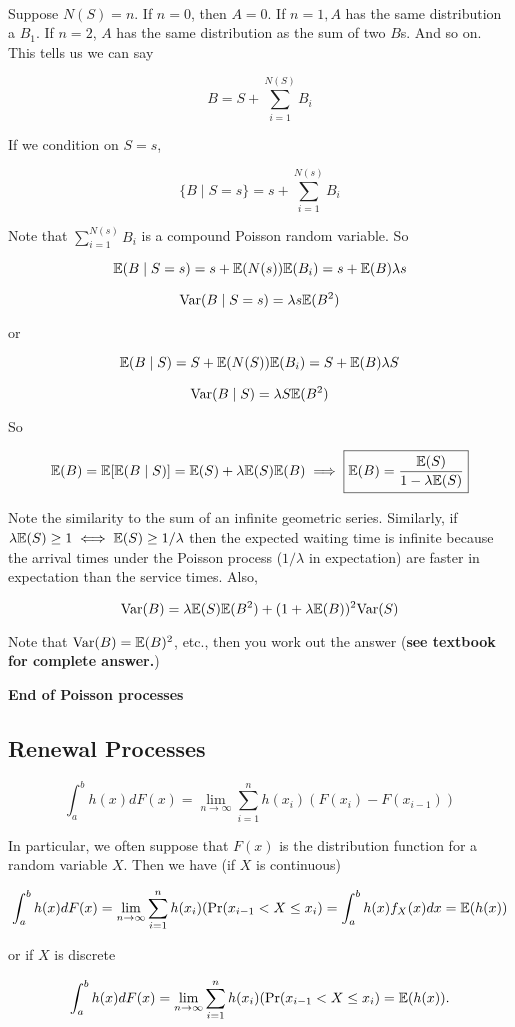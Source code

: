 \

Suppose \(N(S) = n\). If \(n=0\), then \(A = 0\). If \(n=1, A\) has the same distribution a \(B_1\). If \(n=2\), \(A\) has the same distribution as the sum of two \(B\)s. And so on. This tells us we can say

\[
B = S + \sum_{i=1}^{N(S)} B_i
\]

If we condition on \(S=s\),

\[
\{B \mid S =s\} = s + \sum_{i=1}^{N(s)} B_i
\]

Note that \( \sum_{i=1}^{N(s)} B_i\) is a compound Poisson random variable. So

\[
\E(B \mid S =s) = s +\E(N(s)) \E( B_i) = s + \E(B) \lambda s
\]

\[
\Var(B \mid S=s) = \lambda s \E(B^2)
\]

or

\[
\E(B \mid S) = S +\E(N(S)) \E( B_i) = S + \E(B) \lambda S
\]

\[
\Var(B \mid S) = \lambda S \E(B^2)
\]

So

\[
\E(B) = \E[\E(B \mid S)] = \E(S) + \lambda \E(S) \E(B) \implies \boxed{\E(B) = \frac{\E(S)}{1 - \lambda \E(S)}}
\]

Note the similarity to the sum of an infinite geometric series. Similarly, if \(\lambda \E(S) \geq 1 \iff \E(S) \geq 1/\lambda\) then the expected waiting time is infinite because the arrival times under the Poisson process (\(1/\lambda\) in expectation) are faster in expectation than the service times. Also,

\[
\Var(B) = \lambda \E(S) \E(B^2) + (1 + \lambda \E(B))^2 \Var(S)
\]

Note that \(\Var(B) = \E(B)^2\), etc., then you work out the answer (\textbf{see textbook for complete answer.})

\textbf{End of Poisson processes}

\subsection{Renewal Processes}

\begin{definition}

\[
\int_a^b h(x) dF(x) = \lim_{n \to \infty} \sum_{i=1}^n h(x_i)( F(x_i ) - F(x_{i-1}))
\]

In particular, we often suppose that \(F(x)\) is the distribution function for a random variable \(X\). Then we have (if \(X\) is continuous)

\[
\int_a^b h(x) dF(x) = \lim_{n \to \infty} \sum_{i=1}^n h(x_i)( \Pr(x_{i-1}< X \leq x_i) = \int_a^b h(x) f_X(x) dx = \E(h(x))
\]

or if \(X\) is discrete

\[
\int_a^b h(x) dF(x) = \lim_{n \to \infty} \sum_{i=1}^n h(x_i)( \Pr(x_{i-1}< X \leq x_i) = \E(h(x)).
\]


\end{definition}

